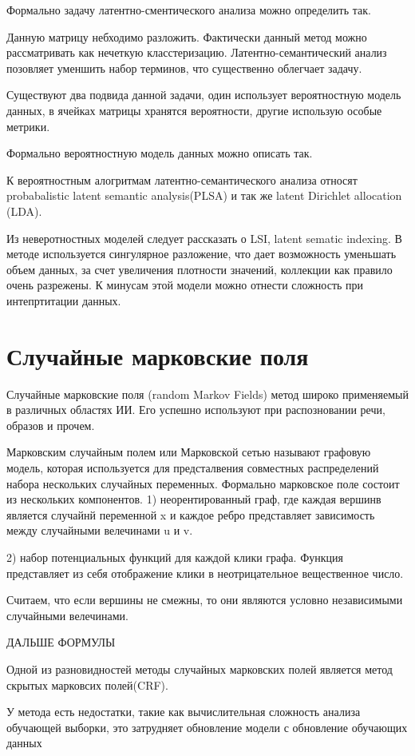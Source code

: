 \documentclass[annotation,times,page4]{itmo-student-thesis}
\begin{document}
Формально задачу латентно-сментического анализа можно определить так.

Данную матрицу небходимо разложить. Фактически данный метод можно рассматривать как нечеткую класстеризацию. Латентно-семантический анализ позовляет уменшить набор терминов, что существенно облегчает задачу.

Существуют два подвида данной задачи, один использует вероятностную модель данных, в ячейках матрицы хранятся вероятности, другие использую особые метрики.

Формально вероятностную модель данных можно описать так.

К вероятностным алогритмам латентно-семантического анализа относят  probabalistic latent semantic analysis(PLSA) и так же latent Dirichlet allocation (LDA).

Из неверотностных моделей следует рассказать о LSI, latent sematic indexing. В методе используется сингулярное разложение, что дает возможность уменьшать объем данных, за счет увеличения плотности значений, коллекции как правило очень разрежены. К минусам этой модели можно отнести сложность при интепртитации данных. 

\section{Случайные марковские поля}
Случайные марковские поля (random Markov Fields) метод широко применяемый в различных областях ИИ. Его успешно используют при распозновании речи, образов и прочем.

Марковским случайным полем или Марковской сетью называют графовую модель, которая используется для предсталвения совместных распределений набора нескольких случайных переменных. Формально марковское поле состоит из нескольких компонентов.
1) неорентированный граф, где каждая вершинв является случайнй переменной x и каждое ребро представляет зависимость между случайными велечинами u и v.

2) набор потенциальных функций для каждой клики графа. Функция представляет из себя отображение клики в неотрицательное вещественное число.

Считаем, что если вершины не смежны, то они являются условно независимыми случайными велечинами.

ДАЛЬШЕ ФОРМУЛЫ

Одной из разновидностей методы случайных марковских полей является метод скрытых марковсих полей(CRF).

У метода есть недостатки, такие как вычислительная сложность анализа обучающей выборки, это затрудняет обновление модели с обновление обучающих данных 
\end{document}

